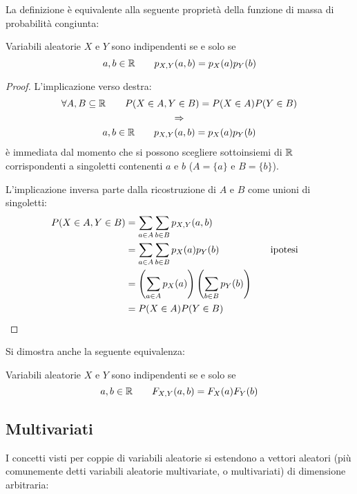 La definizione è equivalente alla seguente proprietà della funzione di massa di probabilità congiunta:
\begin{prop}
	Variabili aleatorie $X$ e $Y$ sono indipendenti se e solo se
	\begin{equation*}
		a,b\in\mathbb R\qquad p_{X,Y}(a,b)=p_X(a)p_Y(b)
	\end{equation*}
\end{prop}
\begin{proof}
	L'implicazione verso destra:
	\begin{gather*}
		\forall A,B\subseteq\mathbb R\qquad P(X\in A, Y\in B)=P(X\in A)P(Y\in B) \\
		\Rightarrow \\
		a,b\in\mathbb R\qquad p_{X,Y}(a,b)=p_X(a)p_Y(b)
	\end{gather*}
	è immediata dal momento che si possono scegliere sottoinsiemi di $\mathbb R$ corrispondenti a singoletti contenenti $a$ e $b$ ($A=\{a\}$ e $B=\{b\}$).

	L'implicazione inversa parte dalla ricostruzione di $A$ e $B$ come unioni di singoletti:
	\begin{align*}
		P(X\in A, Y\in B) & = \sum_{a\in A}\sum_{b\in B} p_{X,Y}(a,b)                           \\
		                  & = \sum_{a\in A}\sum_{b\in B} p_X(a)p_Y(b) & \quad & \text{ipotesi}              \\
		                  & = \left(\sum_{a\in A}p_X(a)\right)\left(\sum_{b\in B} p_Y(b)\right) \\
		                  & = P(X\in A)P(Y\in B)
	\end{align*}
\end{proof}

Si dimostra anche la seguente equivalenza:
\begin{prop}
	Variabili aleatorie $X$ e $Y$ sono indipendenti se e solo se
	\begin{equation*}
		a,b\in\mathbb R\qquad F_{X,Y}(a,b)=F_X(a)F_Y(b)
	\end{equation*}
\end{prop}



\subsection{Multivariati}
I concetti visti per coppie di variabili aleatorie si estendono a vettori aleatori (più comunemente detti variabili aleatorie multivariate, o multivariati) di dimensione arbitraria:


